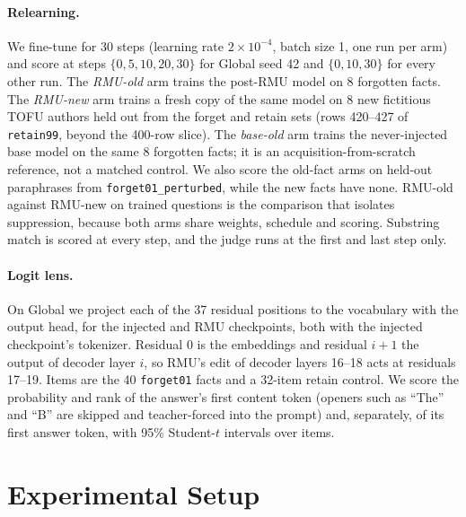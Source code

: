 \documentclass[10pt,twocolumn]{article}
\newcommand{\code}[1]{\texttt{#1}}
\begin{document}
\paragraph{Relearning.} We fine-tune for 30 steps (learning rate $2\times10^{-4}$, batch size 1, one run per arm) and score at steps $\{0,5,10,20,30\}$ for Global seed 42 and $\{0,10,30\}$ for every other run. The \emph{RMU-old} arm trains the post-RMU model on 8 forgotten facts. The \emph{RMU-new} arm trains a fresh copy of the same model on 8 new fictitious TOFU authors held out from the forget and retain sets (rows 420--427 of \code{retain99}, beyond the 400-row slice). The \emph{base-old} arm trains the never-injected base model on the same 8 forgotten facts; it is an acquisition-from-scratch reference, not a matched control. We also score the old-fact arms on held-out paraphrases from \code{forget01\_perturbed}, while the new facts have none. RMU-old against RMU-new on trained questions is the comparison that isolates suppression, because both arms share weights, schedule and scoring. Substring match is scored at every step, and the judge runs at the first and last step only.

\paragraph{Logit lens.} On Global we project each of the 37 residual positions to the vocabulary with the output head, for the injected and RMU checkpoints, both with the injected checkpoint's tokenizer. Residual 0 is the embeddings and residual $i+1$ the output of decoder layer $i$, so RMU's edit of decoder layers 16--18 acts at residuals 17--19. Items are the 40 \code{forget01} facts and a 32-item retain control. We score the probability and rank of the answer's first content token (openers such as ``The'' and ``B'' are skipped and teacher-forced into the prompt) and, separately, of its first answer token, with 95\% Student-$t$ intervals over items.

\section{Experimental Setup}
\label{sec:setup}
\end{document}
